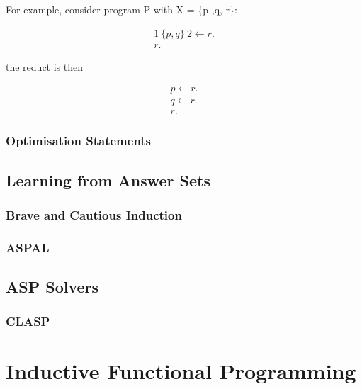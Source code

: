 For example, consider program P with X = \{p ,q, r\}:

\begin{align*}
1 \: \{p, q\} \: 2 \gets r. \\
r.
\end{align*}

the reduct is then

\begin{align*}
p \gets r. \\
q \gets r. \\
r.
\end{align*}


\subsubsection{Optimisation Statements}

\subsection{Learning from Answer Sets}

\subsubsection{Brave and Cautious Induction}

\subsubsection{ASPAL}

\subsection{ASP Solvers}

\subsubsection{CLASP}

\section{Inductive Functional Programming}

